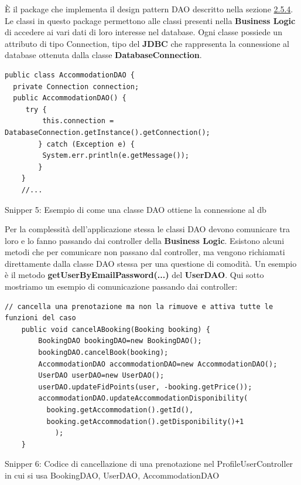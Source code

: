 \documentclass[10pt]{article}
\begin{document}
\`E il package che implementa il design pattern DAO descritto nella sezione \hyperref[daosec]{2.5.4}. Le classi in questo package permettono alle classi presenti nella \textbf{Business Logic} di accedere ai vari dati di loro interesse nel database. Ogni classe possiede un attributo di tipo Connection, tipo del \textbf{JDBC} che rappresenta la connessione al database ottenuta dalla classe \textbf{DatabaseConnection}.
\newline
\begin{lstlisting}
public class AccommodationDAO {
  private Connection connection;
  public AccommodationDAO() {
     try {
         this.connection = DatabaseConnection.getInstance().getConnection();
        } catch (Exception e) {
         System.err.println(e.getMessage());
        }
    }
    //...
\end{lstlisting}
\begin{center}
\par
Snipper 5: Esempio di come una classe DAO ottiene la connessione al db
\par\medskip
\end{center}
Per la complessit\`a dell'applicazione stessa le classi DAO devono comunicare tra loro e lo fanno passando dai controller della \textbf{Business Logic}. Esistono alcuni metodi che per comunicare non passano dal controller, ma vengono richiamati direttamente dalla classe DAO stessa per una questione di comodit\`a. Un esempio è il metodo \textbf{getUserByEmailPassword(...)} del \textbf{UserDAO}.
\newline
Qui sotto mostriamo un esempio di comunicazione passando dai controller:
\begin{lstlisting}
// cancella una prenotazione ma non la rimuove e attiva tutte le funzioni del caso
    public void cancelABooking(Booking booking) {
        BookingDAO bookingDAO=new BookingDAO();
        bookingDAO.cancelBook(booking);
        AccommodationDAO accommodationDAO=new AccommodationDAO();
        UserDAO userDAO=new UserDAO();
        userDAO.updateFidPoints(user, -booking.getPrice());
        accommodationDAO.updateAccommodationDisponibility(
          booking.getAccommodation().getId(),
          booking.getAccommodation().getDisponibility()+1
            );
    }
\end{lstlisting}
\begin{center}
\par
Snipper 6: Codice di cancellazione di una prenotazione nel ProfileUserController in cui si usa BookingDAO, UserDAO, AccommodationDAO
\par\medskip
\end{center}
\end{document}
